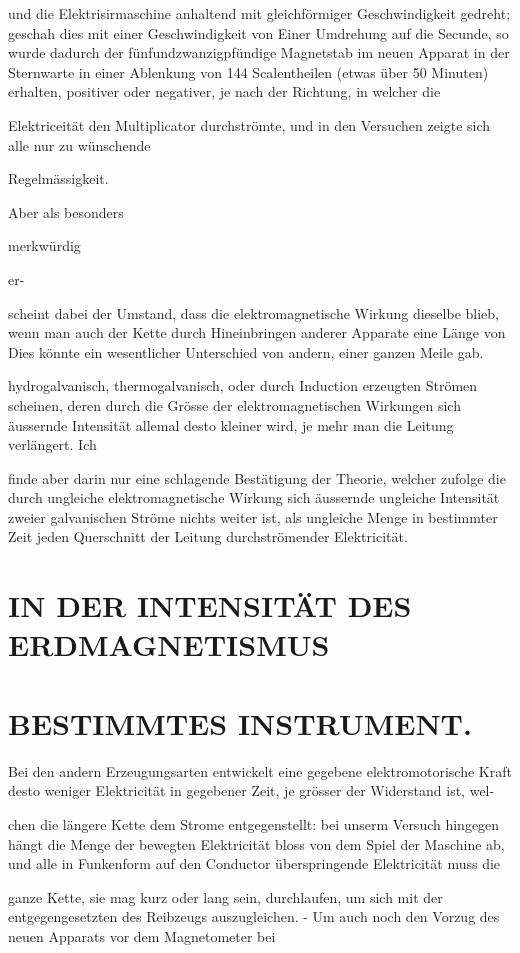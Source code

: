 \documentclass[12pt,a4paper]{article}
\begin{document}
und die Elektrisirmaschine anhaltend mit gleichförmiger Geschwindigkeit gedreht; geschah dies mit einer Geschwindigkeit von Einer Umdrehung auf die Secunde, so wurde dadurch der fünfundzwanzigpfündige Magnetstab im neuen Apparat in der Sternwarte in einer Ablenkung von 144 Scalentheilen (etwas über 50 Minuten) erhalten, positiver oder negativer, je nach der Richtung, in welcher die

Elektriceität den Multiplicator durchströmte, und in den Versuchen zeigte sich alle nur zu wünschende

Regelmässigkeit.

Aber als besonders

merkwürdig

er-

scheint dabei der Umstand, dass die elektromagnetische Wirkung dieselbe blieb, wenn man auch der Kette durch Hineinbringen anderer Apparate eine Länge von Dies könnte ein wesentlicher Unterschied von andern, einer ganzen Meile gab.

hydrogalvanisch, thermogalvanisch, oder durch Induction erzeugten Strömen scheinen, deren durch die Grösse der elektromagnetischen Wirkungen sich äussernde Intensität allemal desto kleiner wird, je mehr man die Leitung verlängert. Ich

finde aber darin nur eine schlagende Bestätigung der Theorie, welcher zufolge die durch ungleiche elektromagnetische Wirkung sich äussernde ungleiche Intensität zweier galvanischen Ströme nichts weiter ist, als ungleiche Menge in bestimmter Zeit jeden Querschnitt der Leitung durchströmender Elektricität.

\section*{IN DER INTENSITÄT DES ERDMAGNETISMUS}
\section*{BESTIMMTES INSTRUMENT.}
Bei den andern Erzeugungsarten entwickelt eine gegebene elektromotorische Kraft desto weniger Elektricität in gegebener Zeit, je grösser der Widerstand ist, wel-

chen die längere Kette dem Strome entgegenstellt: bei unserm Versuch hingegen hängt die Menge der bewegten Elektricität bloss von dem Spiel der Maschine ab, und alle in Funkenform auf den Conductor überspringende Elektricität muss die

ganze Kette, sie mag kurz oder lang sein, durchlaufen, um sich mit der entgegengesetzten des Reibzeugs auszugleichen. - Um auch noch den Vorzug des neuen Apparats vor dem Magnetometer bei
\end{document}
